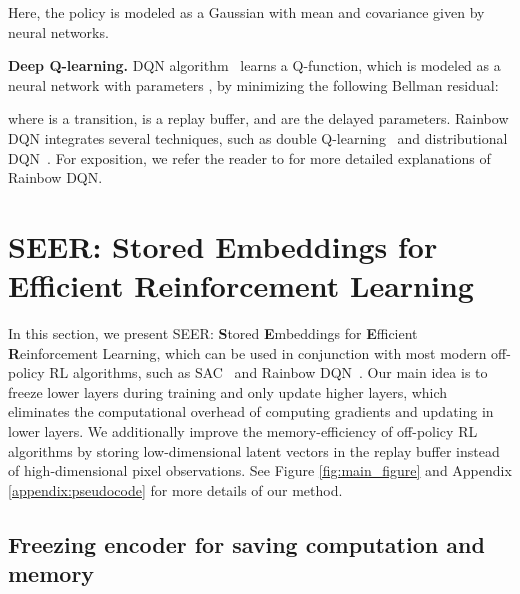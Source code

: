 \documentclass{article}
\begin{document}
Here, the policy is modeled as a Gaussian with mean and covariance given by neural networks.

{\bf Deep Q-learning.} DQN algorithm~\citep{mnih2015human} learns a Q-function, which is modeled as a neural network with parameters ,
by minimizing the following Bellman residual:

where  is a transition,
 is a replay buffer, 
and  are the delayed parameters.
Rainbow DQN integrates several techniques,
such as double Q-learning~\citep{van2016deep} and distributional DQN~\citep{bellemare2017distributional}.
For exposition, we refer the reader to \citet{hessel2018rainbow} for more detailed explanations of Rainbow DQN.





\section{SEER: Stored Embeddings for Efficient Reinforcement Learning}

In this section, we present SEER: {\bf S}tored {\bf E}mbeddings for {\bf E}fficient {\bf R}einforcement Learning, which can be used in conjunction with most modern off-policy RL algorithms, such as SAC~\citep{haarnoja2018soft} and Rainbow DQN~\citep{hessel2018rainbow}.
Our main idea is to freeze lower layers during training and only update higher layers, which eliminates the computational overhead of computing gradients and updating in lower layers.
We additionally improve the memory-efficiency of off-policy RL algorithms by storing low-dimensional latent vectors in the replay buffer instead of high-dimensional pixel observations. See Figure \ref{fig:main_figure} and 
Appendix \ref{appendix:pseudocode} for more details of our method.

\subsection{Freezing encoder for saving computation and memory} \label{sec:freezing_encoder}
\end{document}
